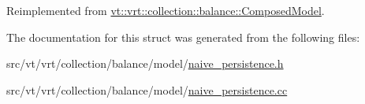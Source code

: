 Reimplemented from \hyperlink{classvt_1_1vrt_1_1collection_1_1balance_1_1_composed_model_a5de9a43648cfd18ca00f1f0a6c61be4d}{vt\+::vrt\+::collection\+::balance\+::\+Composed\+Model}.



The documentation for this struct was generated from the following files\+:\begin{DoxyCompactItemize}
\item 
src/vt/vrt/collection/balance/model/\hyperlink{naive__persistence_8h}{naive\+\_\+persistence.\+h}\item 
src/vt/vrt/collection/balance/model/\hyperlink{naive__persistence_8cc}{naive\+\_\+persistence.\+cc}\end{DoxyCompactItemize}
